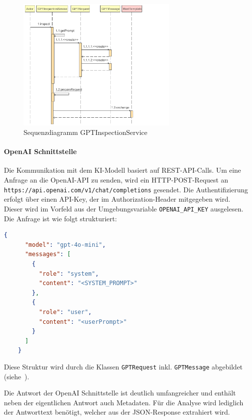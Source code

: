 \documentclass[a4paper,12pt]{report}
\begin{document}
    \begin{figure}[h]
        \centering
        \includegraphics[width=0.7\textwidth]{assets/GPTInspectionService_inspect_seq_diag}
        \caption{Sequenzdiagramm GPTInspectionService}
        \label{fig:seq-diag-gpt-inspection-service}
    \end{figure}

    \clearpage
    \paragraph*{OpenAI Schnittstelle}\label{par:openai-schnittstelle}
    Die Kommunikation mit dem KI-Modell basiert auf REST-API-Calls.
    Um eine Anfrage an die OpenAI-API zu senden, wird ein HTTP-POST-Request an \texttt{https://api.openai.com/v1/chat/completions} gesendet.
    Die Authentifizierung erfolgt über einen API-Key, der im Authorization-Header mitgegeben wird.
    Dieser wird im Vorfeld aus der Umgebungsvariable \texttt{OPENAI\_API\_KEY} ausgelesen.
    Die Anfrage ist wie folgt strukturiert:

    \begin{lstlisting}[language=json,caption={OpenAI Anfrage},label={lst:openai-request}]
    {
      "model": "gpt-4o-mini",
      "messages": [
        {
          "role": "system",
          "content": "<SYSTEM_PROMPT>"
        },
        {
          "role": "user",
          "content": "<userPrompt>"
        }
      ]
    }
    \end{lstlisting}
    Diese Struktur wird durch die Klassen \texttt{GPTRequest} inkl. \texttt{GPTMessage} abgebildet (siehe~).

    Die Antwort der OpenAI Schnittstelle ist deutlich umfangreicher und enthält neben der eigentlichen Antwort auch Metadaten.
    Für die Analyse wird lediglich der Antworttext benötigt, welcher aus der JSON-Response extrahiert wird.
\end{document}
